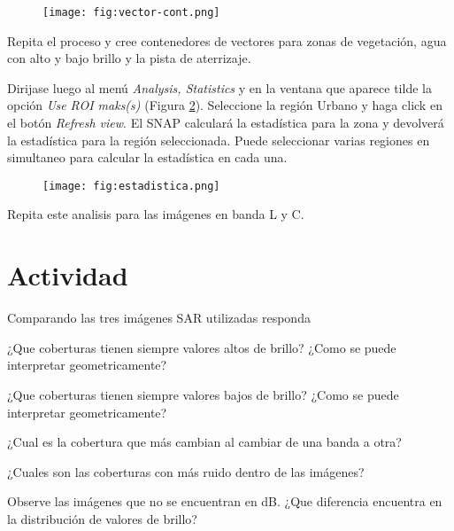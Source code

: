 \begin{figure}[h!]
    \centering
    \texttt{[image: fig:vector-cont.png]}
    \caption{}
    \label{fig:vector-cont}
\end{figure}

Repita el proceso y cree contenedores de vectores para zonas de vegetación, agua con alto y bajo brillo y la pista de aterrizaje.

Dirijase luego al menú \emph{Analysis, Statistics} y en la ventana que aparece tilde la opción \emph{Use ROI maks(s)} (Figura \ref{fig:estadistica}). Seleccione la región Urbano y haga click en el botón \emph{Refresh view}. El SNAP calculará la estadística para la zona y devolverá la estadística para la región seleccionada. Puede seleccionar varias regiones en simultaneo para calcular la estadística en cada una.

\begin{figure}[h!]
    \centering
    \texttt{[image: fig:estadistica.png]}
    \caption{}
    \label{fig:estadistica}
\end{figure}

Repita este analisis para las imágenes en banda L y C.

\section{Actividad}

Comparando las tres imágenes SAR utilizadas responda

\begin{que}
    ¿Que coberturas tienen siempre valores altos de brillo? ¿Como se puede interpretar geometricamente?
\end{que}

\begin{que}
    ¿Que coberturas tienen siempre valores bajos de brillo? ¿Como se puede interpretar geometricamente?
\end{que}

\begin{que}
    ¿Cual es la cobertura que más cambian al cambiar de una banda a otra?
\end{que}

\begin{que}
    ¿Cuales son las coberturas con más ruido dentro de las imágenes?
\end{que}

\begin{que}
    Observe las imágenes que no se encuentran en dB. ¿Que diferencia encuentra en la distribución de valores de brillo?
\end{que}
